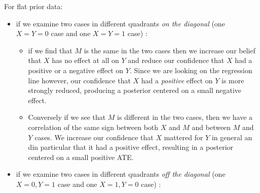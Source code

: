 \documentclass[12pt,]{book}
\providecommand{\tightlist}{%
  \setlength{\itemsep}{0pt}\setlength{\parskip}{0pt}}
\begin{document}
For flat prior data:

\begin{itemize}
\item
  if we examine two cases in different quadrants \emph{on the diagonal} (one \(X=Y=0\) case and one \(X=Y=1\) case) :

  \begin{itemize}
  \tightlist
  \item
    if we find that \(M\) is the same in the two cases then we increase our belief that \(X\) has no effect at all on \(Y\) and reduce our confidence that \(X\) had a positive or a negative effect on \(Y\). Since we are looking on the regression line however, our confidence that \(X\) had a \emph{positive} effect on \(Y\) is more strongly reduced, producing a posterior centered on a small negative effect.
  \item
    Conversely if we see that \(M\) is different in the two cases, then we have a correlation of the same sign between both \(X\) and \(M\) and between \(M\) and \(Y\) cases. We increase our confidence that \(X\) mattered for \(Y\) in general an din particular that it had a positive effect, resulting in a posterior centered on a small positive ATE.
  \end{itemize}
\item
  if we examine two cases in different quadrants \emph{off the diagonal} (one \(X=0, Y=1\) case and one \(X=1, Y=0\) case) :


\end{itemize}
\end{document}
